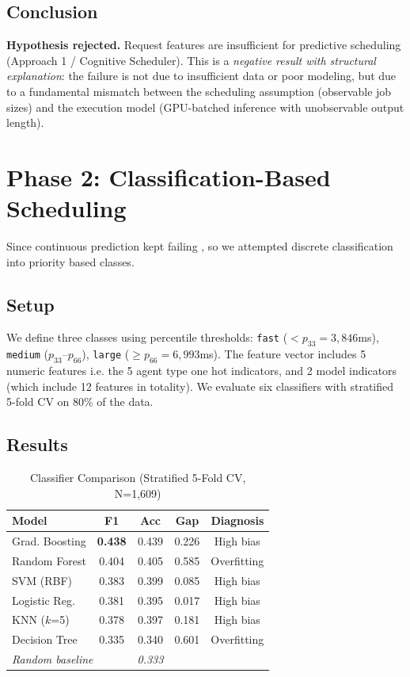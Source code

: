\documentclass[conference]{IEEEtran}
\begin{document}
\subsection{Conclusion}
\textbf{Hypothesis rejected.} Request features are insufficient for predictive scheduling (Approach 1 / Cognitive Scheduler). This is a \textit{negative result with structural explanation}: the failure is not due to insufficient data or poor modeling, but due to a fundamental mismatch between the scheduling assumption (observable job sizes) and the execution model (GPU-batched inference with unobservable output length).

\section{Phase 2: Classification-Based Scheduling}

Since continuous prediction kept failing , so we attempted discrete classification into priority based classes.

\subsection{Setup}
We define three classes using percentile thresholds: \texttt{fast} ($< p_{33} = 3,846$ms), \texttt{medium} ($p_{33}$--$p_{66}$), \texttt{large} ($\geq p_{66} = 6,993$ms). The feature vector includes 5 numeric features i.e. the 5 agent type one hot indicators, and 2 model indicators (which include 12 features in totality). We evaluate six classifiers with stratified 5-fold CV on 80\% of the data.

\subsection{Results}

\begin{table}[htbp]
\caption{Classifier Comparison (Stratified 5-Fold CV, N=1,609)}
\begin{center}
\begin{tabular}{lcccc}
\toprule
\textbf{Model} & \textbf{F1} & \textbf{Acc} & \textbf{Gap} & \textbf{Diagnosis} \\
\midrule
Grad. Boosting & \textbf{0.438} & 0.439 & 0.226 & High bias \\
Random Forest & 0.404 & 0.405 & 0.585 & Overfitting \\
SVM (RBF) & 0.383 & 0.399 & 0.085 & High bias \\
Logistic Reg. & 0.381 & 0.395 & 0.017 & High bias \\
KNN ($k$=5) & 0.378 & 0.397 & 0.181 & High bias \\
Decision Tree & 0.335 & 0.340 & 0.601 & Overfitting \\
\midrule
\multicolumn{2}{l}{\textit{Random baseline}} & \multicolumn{1}{c}{\textit{0.333}} & & \\
\bottomrule
\end{tabular}
\label{tab:classifiers}
\end{center}
\end{table}
\end{document}
